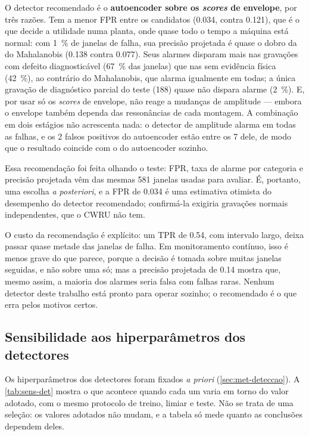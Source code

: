 O detector recomendado é o \textbf{autoencoder sobre os \emph{scores} de
envelope}, por três razões. Tem a menor FPR entre os candidatos (\num{0.034},
contra \num{0.121}), que é o que decide a utilidade numa planta, onde quase todo
o tempo a máquina está normal: com \SI{1}{\percent} de janelas de falha, sua
precisão projetada é quase o dobro da do Mahalanobis (\num{0.138} contra
\num{0.077}). Seus alarmes disparam mais nas gravações com defeito diagnosticável
(\SI{67}{\percent} das janelas) que nas sem evidência física (\SI{42}{\percent}),
ao contrário do Mahalanobis, que alarma igualmente em todas; a única gravação de
diagnóstico parcial do teste (188) quase não dispara alarme (\SI{2}{\percent}). E,
por usar só os \emph{scores} de envelope, não reage a mudanças de amplitude ---
embora o envelope também dependa das ressonâncias de cada montagem. A combinação
em dois estágios não acrescenta nada: o detector de amplitude alarma em todas as
falhas, e os 2 falsos positivos do autoencoder estão entre os 7 dele, de modo que
o resultado coincide com o do autoencoder sozinho.

Essa recomendação foi feita olhando o teste: FPR, taxa de alarme por categoria e
precisão projetada vêm das mesmas 581 janelas usadas para avaliar. É, portanto,
uma escolha \emph{a posteriori}, e a FPR de \num{0.034} é uma estimativa otimista
do desempenho do detector recomendado; confirmá-la exigiria gravações normais
independentes, que o CWRU não tem.

O custo da recomendação é explícito: um TPR de \num{0.54}, com intervalo largo,
deixa passar quase metade das janelas de falha. Em monitoramento contínuo, isso é
menos grave do que parece, porque a decisão é tomada sobre muitas janelas
seguidas, e não sobre uma só; mas a precisão projetada de \num{0.14} mostra que,
mesmo assim, a maioria dos alarmes seria falsa com falhas raras. Nenhum detector
deste trabalho está pronto para operar sozinho; o recomendado é o que erra pelos
motivos certos.

\subsection{Sensibilidade aos hiperparâmetros dos detectores}
\label{sec:res-sensibilidade-det}

Os hiperparâmetros dos detectores foram fixados \emph{a priori}
(\autoref{sec:met-deteccao}). A \autoref{tab:sens-det} mostra o que acontece
quando cada um varia em torno do valor adotado, com o mesmo protocolo de treino,
limiar e teste. Não se trata de uma seleção: os valores adotados não mudam, e a
tabela só mede quanto as conclusões dependem deles.

